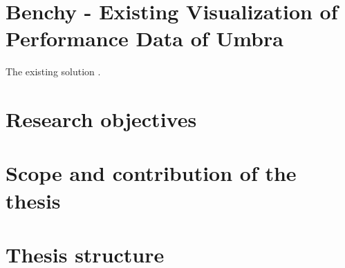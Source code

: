 \section{Benchy - Existing Visualization of Performance Data of Umbra}\label{sec:benchy}
The existing solution \parencite*{benchy}.

\section{Research objectives}
\section{Scope and contribution of the thesis}
\section{Thesis structure}

